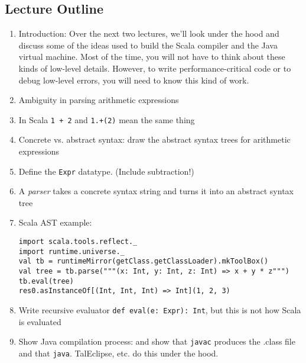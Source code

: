 \newlecture

\begin{instructor}

\section*{Lecture Outline}

\begin{enumerate}

  \item Introduction: Over the next two lectures, we'll look under the
hood and discuss some of the ideas used to build the Scala compiler
and the Java virtual machine.  Most of the time, you will not have to
think about these kinds of low-level details.  However, to write
performance-critical code or to debug low-level errors, you will need
to know this kind of work.

  \item Ambiguity in parsing arithmetic expressions

  \item In Scala \lstinline|1 + 2| and \lstinline|1.+(2)| mean the same thing

  \item Concrete vs. abstract syntax: draw the abstract syntax trees for arithmetic expressions

  \item Define the \lstinline|Expr| datatype. (Include subtraction!)

  \item A \emph{parser} takes a concrete syntax string and turns it into an abstract syntax tree

  \item Scala AST example:

\begin{lstlisting}
import scala.tools.reflect._
import runtime.universe._
val tb = runtimeMirror(getClass.getClassLoader).mkToolBox()
val tree = tb.parse("""(x: Int, y: Int, z: Int) => x + y * z""")
tb.eval(tree)
res0.asInstanceOf[(Int, Int, Int) => Int](1, 2, 3)
\end{lstlisting}

  \item Write recursive evaluator \lstinline|def eval(e: Expr): Int|, but this is not how Scala is evaluated

  \item Show Java compilation process:
   and show that \lstinline|javac| produces the .class file
  and that \lstinline|java|. TalEclipse, etc. do this under the hood.


\end{enumerate}
\end{instructor}
